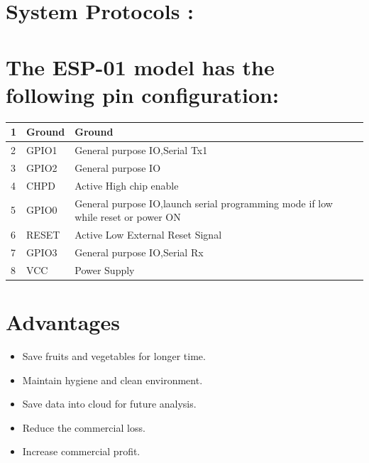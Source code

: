 \documentclass{report}
\begin{document}
\begin{multicols}{1}
 \section*{System Protocols :} 

    \section*{The ESP-01 model has the following pin configuration:} 
    \begin{center}
    \begin{tabular}{ | m{1em} | m{4em} | m{5cm} |}
    \hline
    \textbf 1 & Ground & Ground \\ 
    \hline
     2 & GPIO1 & General purpose IO,Serial Tx1\\ 
    \hline
     3 & GPIO2 & General purpose IO\\ 
    \hline
     4 & CHPD & Active High chip enable\\
    \hline
     5 & GPIO0 & General purpose IO,launch serial programming mode if low while reset or power ON\\
    \hline
     6 & RESET & Active Low External Reset Signal\\
    \hline
     7 & GPIO3 & General purpose IO,Serial Rx\\
    \hline
     8 & VCC & Power Supply\\
    \hline

    \end{tabular}
    \end{center}

    

        \section*{Advantages}
    \begin{itemize}
        \item Save fruits and vegetables for longer time.
        \item Maintain hygiene and clean environment.
        \item Save data into cloud for future analysis.
        \item Reduce the commercial loss.
        \item Increase commercial profit.
    \end{itemize}

\end{multicols}
\end{document}
